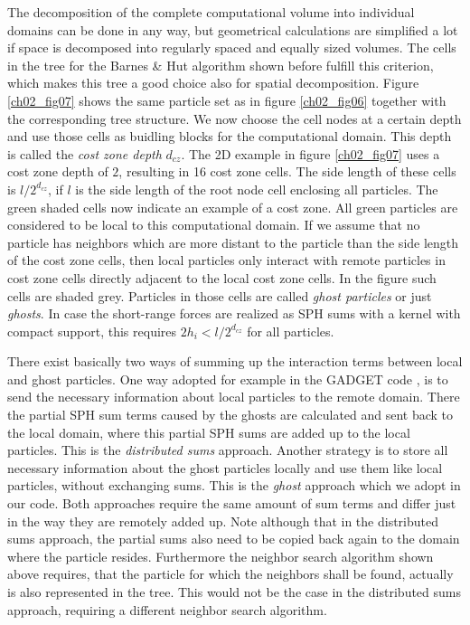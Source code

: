 The decomposition of the complete computational volume into individual domains can be done in any way, but geometrical calculations are simplified a lot if space is decomposed into regularly spaced and equally sized volumes. The cells in the tree for the Barnes \& Hut algorithm shown before fulfill this criterion, which makes this tree a good choice also for spatial decomposition. Figure \ref{ch02_fig07} shows the same particle set as in figure \ref{ch02_fig06} together with the corresponding tree structure. We now choose the cell nodes at a certain depth and use those cells as buidling blocks for the computational domain. This depth is called the \emph{cost zone depth} $d_{cz}$. The 2D example in figure \ref{ch02_fig07} uses a cost zone depth of $2$, resulting in 16 cost zone cells. The side length of these cells is $l / 2^{d_{cz}}$, if $l$ is the side length of the root node cell enclosing all particles. The green shaded cells now indicate an example of a cost zone. All green particles are considered to be local to this computational domain. If we assume that no particle has neighbors which are more distant to the particle than the side length of the cost zone cells, then local particles only interact with remote particles in cost zone cells directly adjacent to the local cost zone cells. In the figure such cells are shaded grey. Particles in those cells are called \emph{ghost particles} or just \emph{ghosts}. In case the short-range forces are realized as SPH sums with a kernel with compact support, this requires $2h_i < l / 2^{d_{cz}}$ for all particles. 

There exist basically two ways of summing up the interaction terms between local and ghost particles. One way adopted for example in the GADGET code \citep{Springel:2005p51}, is to send the necessary information about local particles to the remote domain. There the partial SPH sum terms caused by the ghosts are calculated and sent back to the local domain, where this partial SPH sums are added up to the local particles. This is the \emph{distributed sums} approach. Another strategy is to store all necessary information about the ghost particles locally and use them like local particles, without exchanging sums. This is the \emph{ghost} approach which we adopt in our code. Both approaches require the same amount of sum terms and differ just in the way they are remotely added up. Note although that in the distributed sums approach, the partial sums also need to be copied back again to the domain where the particle resides. Furthermore the neighbor search algorithm shown above requires, that the particle for which the neighbors shall be found, actually is also represented in the tree. This would not be the case in the distributed sums approach, requiring a different neighbor search algorithm. 

